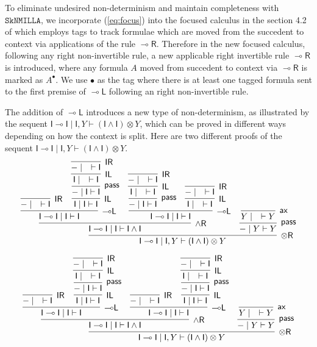 \documentclass[submission,copyright,creativecommons]{eptcs}
\theoremstyle{definition}
\newcommand{\tr}{\otimes \mathsf{R}}
\newcommand{\lright}{{\multimap}\mathsf{R}}
\newcommand{\lleft}{{\multimap}\mathsf{L}}
\newcommand{\pass}{\mathsf{pass}}
\newcommand{\unitl}{\mathsf{IL}}
\newcommand{\unitr}{\mathsf{IR}}
\newcommand{\andr}{\land \mathsf{R}}
\newcommand{\ax}{\mathsf{ax}}
\newcommand{\ot}{\otimes}
\newcommand{\lolli}{\multimap}
\newcommand{\I}{\mathsf{I}}
\newcommand{\SkNMILLA}{$\mathtt{SkNMILLA}$}
\begin{document}
To eliminate undesired non-determinism and maintain completeness with \SkNMILLA, we incorporate (\ref{eq:focus}) into the focused calculus in the section 4.2 of \cite{UVW:protsn} which employs tags to track formulae which are moved from the succedent to context via applications of the rule $\lright$.
Therefore in the new focused calculus, following any right non-invertible rule, a new applicable right invertible rule $\lright$ is introduced, where any formula $A$ moved from succedent to context via $\lright$ is marked as $A^{\bullet}$.
We use $\bullet$ as the tag where there is at least one tagged formula sent to the first premise of $\lleft$ following an right non-invertible rule.

The addition of $\lleft$ introduces a new type of non-determinism, as illustrated by the sequent $\I \lolli \I \mid \I , Y \vdash (\I \land \I) \ot Y$, which can be proved in different ways depending on how the context is split.
Here are two different proofs of the sequent $\I \lolli \I \mid \I , Y \vdash (\I \land \I) \ot Y$.
\begin{equation}\label{eq:ex:lleft:NonDeter}
  \begin{array}{c}
    \infer[\tr]{\I \lolli \I \mid \I , Y \vdash (\I \land \I) \ot Y}{
      \infer[\andr]{\I \lolli \I \mid \I \vdash \I \land \I}{
        \infer[\lleft]{\I \lolli \I \mid \I \vdash \I}{
      \infer[\unitr]{- \mid \quad \vdash \I}{}
      &
      \infer[\unitl]{\I \mid \I \vdash \I}{
        \infer[\pass]{- \mid \I \vdash \I}{
          \infer[\unitl]{\I \mid \quad \vdash \I}{
            \infer[\unitr]{- \mid \quad \vdash \I}{}
          }
        }
      }
    }
    &
    \infer[\lleft]{\I \lolli \I \mid \I \vdash \I}{
      \infer[\pass]{- \mid \I \vdash \I}{
        \infer[\unitl]{\I \mid \quad \vdash \I}{
          \infer[\unitr]{- \mid \quad \vdash \I}{}
        }
      }
      &
      \infer[\unitl]{\I \mid \quad \vdash \I}{
        \infer[\unitr]{- \mid \quad \vdash \I}{}
      }
    }
      }
      &
      \infer[\pass]{- \mid Y \vdash Y}{
        \infer[\ax]{Y \mid \quad \vdash Y}{}
      }
    }
    \\[10pt]
    \infer[\tr]{\I \lolli \I \mid \I , Y \vdash (\I \land \I) \ot Y}{
      \infer[\andr]{\I \lolli \I \mid \I \vdash \I \land \I}{
        \infer[\lleft]{\I \lolli \I \mid \I \vdash \I}{
      \infer[\unitr]{- \mid \quad \vdash \I}{}
      &
      \infer[\unitl]{\I \mid \I \vdash \I}{
        \infer[\pass]{- \mid \I \vdash \I}{
          \infer[\unitl]{\I \mid \quad \vdash \I}{
            \infer[\unitr]{- \mid \quad \vdash \I}{}
          }
        }
      }
    }
    &
    \infer[\lleft]{\I \lolli \I \mid \I \vdash \I}{
      \infer[\unitr]{- \mid \quad \vdash \I}{}
      &
      \infer[\unitl]{\I \mid \I \vdash \I}{
        \infer[\pass]{- \mid \I \vdash \I}{
          \infer[\unitl]{\I \mid \quad \vdash \I}{
            \infer[\unitr]{- \mid \quad \vdash \I}{}
          }
        }
      }
    }
      }
      &
      \infer[\pass]{- \mid Y \vdash Y}{
        \infer[\ax]{Y \mid \quad \vdash Y}{}
      }
    }
  \end{array}
\end{equation}
\end{document}
